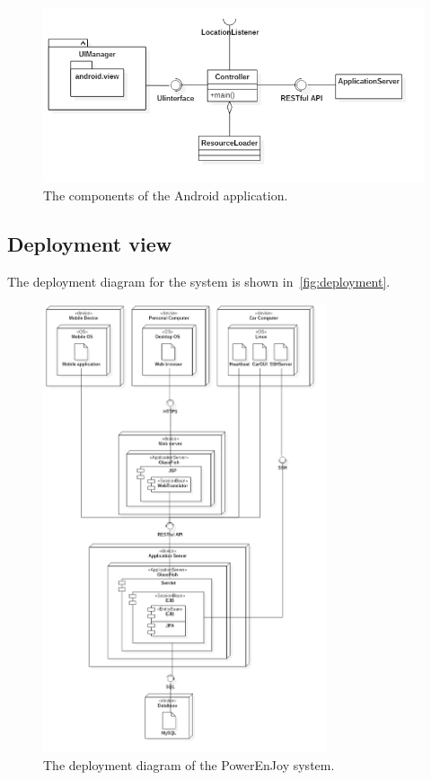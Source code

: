 \begin{figure}[H]
    \centering
    \includegraphics[width=\textwidth, keepaspectratio]{diagrams/Android.png}
    \caption{The components of the Android application.}
    \label{fig:android-app}
\end{figure}

\subsection{Deployment view}

The deployment diagram for the system is shown in~\autoref{fig:deployment}.

\begin{figure}[H]
	\centering
	\includegraphics[height=500px, keepaspectratio]{diagrams/Deployment.png}
	\caption{The deployment diagram of the PowerEnJoy system.}
	\label {fig:deployment}
\end{figure}

